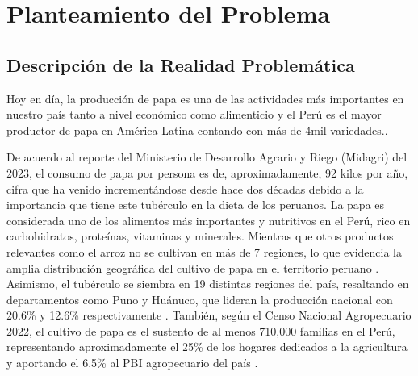 \chapter{Planteamiento del Problema}
\section{Descripción de la Realidad Problemática}

Hoy en día, la producción de papa es una de las actividades más importantes en nuestro país tanto a nivel económico como alimenticio y el Perú es el mayor productor de papa en América Latina contando con más de 4mil variedades.\parencite{cr_elcomercioproduccionpapa}.  


De acuerdo al reporte del Ministerio de Desarrollo Agrario y Riego (Midagri) del 2023, el consumo de papa por persona es de, aproximadamente, 92 kilos por año, cifra que ha venido incrementándose desde hace dos décadas debido a la importancia que tiene este tubérculo en la dieta de los peruanos. La papa es considerada uno de los alimentos más importantes y nutritivos en el Perú, rico en carbohidratos, proteínas, vitaminas y minerales.  Mientras que otros productos relevantes como el arroz no se cultivan en más de 7 regiones, lo que evidencia la amplia distribución geográfica del cultivo de papa en el territorio peruano \parencite{cr_agroinforma1}. Asimismo, el tubérculo se siembra en 19 distintas regiones del país, resaltando en departamentos como Puno y Huánuco, que lideran la producción nacional con 20.6\% y 12.6\% respectivamente \parencite{minagri_estadisticas_2022}. También, según el Censo Nacional Agropecuario 2022, el cultivo de papa es el sustento de al menos 710,000 familias en el Perú, representando aproximadamente el 25\% de los hogares dedicados a la agricultura y aportando el 6.5\% al PBI agropecuario del país \parencite{inei_cenagro_2022}.
 
